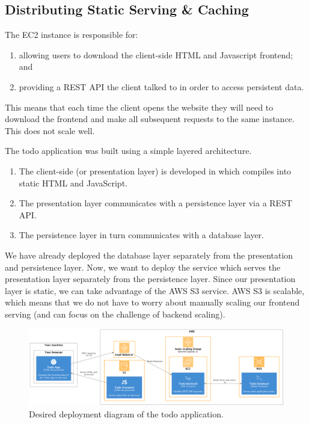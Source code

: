\documentclass{csse4400}
\begin{document}
\subsection{Distributing Static Serving \& Caching}


The EC2 instance is responsible for:
\begin{enumerate}
  \item allowing users to download the client-side HTML and Javascript frontend; and
  \item providing a REST API the client talked to in order to access persistent data.
\end{enumerate}
This means that each time the client opens the website they will need to download the frontend and make all subsequent requests to the same instance.
This does not scale well.

The todo application was built using a simple layered architecture.
\begin{enumerate}
  \item The client-side (or presentation layer) is developed in  which compiles into static HTML and JavaScript.
  \item The presentation layer communicates with a  persistence layer via a REST API.
  \item The persistence layer in turn communicates with a  database layer.
\end{enumerate}

We have already deployed the database layer separately from the presentation and persistence layer.
Now, we want to deploy the service which serves the presentation layer separately from the persistence layer.
Since our presentation layer is static,
we can take advantage of the AWS S3 service.
AWS S3 is scalable, which means that we do not have to worry about manually scaling our frontend serving (and can focus on the challenge of backend scaling).

\begin{figure}[ht]
\includegraphics[width=\textwidth]{diagrams/SimpleS3Deployment}
\caption{Desired deployment diagram of the todo application.}
\end{figure}
\end{document}
